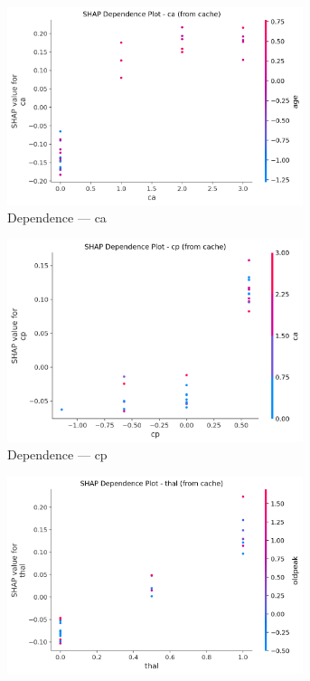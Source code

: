 \begin{figure}[H]
\centering
\begin{subfigure}[b]{0.31\textwidth}
\centering
\includegraphics[width=0.95\textwidth]{Result/heart_dataset/Catboost/SHAP/Dependence CA.png}
\caption{Dependence — ca}
\label{fig:cat_heart_dep_ca}
\end{subfigure}\hfill
\begin{subfigure}[b]{0.31\textwidth}
\centering
\includegraphics[width=0.95\textwidth]{Result/heart_dataset/Catboost/SHAP/Dependence CP.png}
\caption{Dependence — cp}
\label{fig:cat_heart_dep_cp}
\end{subfigure}\hfill
\begin{subfigure}[b]{0.31\textwidth}
\centering
\includegraphics[width=0.95\textwidth]{Result/heart_dataset/Catboost/SHAP/Dependence thal.png}

\end{subfigure}
\end{figure}
